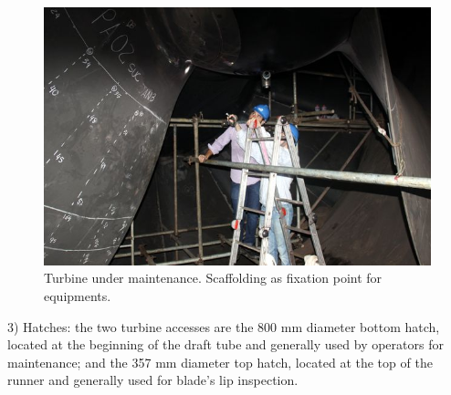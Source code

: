 \begin{figure}[h!]	
	\includegraphics[width=\columnwidth]{figs/viagem/2015_04_28/UG/img_4969}
	\caption{Turbine under maintenance. Scaffolding as fixation point for
	equipments.}
	\label{fig::andaime}
\end{figure}

 
3) Hatches: the two turbine accesses are the 800 mm diameter bottom hatch,
located at the beginning of the draft tube and generally used by operators
for maintenance; and the 357 mm diameter top hatch, located at the top of the
runner and generally used for blade's lip inspection.



